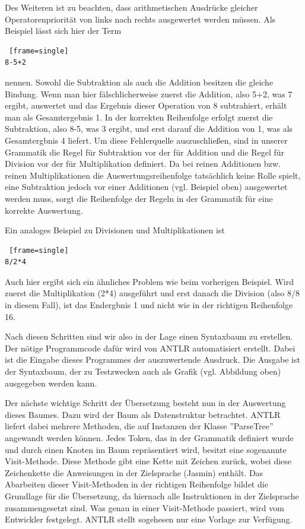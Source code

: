 \documentclass[12pt, a4paper, oneside, ngerman]{article}
\begin{document}
Des Weiteren ist zu beachten, dass arithmetischen Ausdrücke gleicher Operatorenpriorität von links  nach rechts ausgewertet werden müssen. Als Beispiel lässt sich hier der Term 
\begin{lstlisting} [frame=single]
8-5+2
\end{lstlisting}
nennen. Sowohl die Subtraktion als auch die Addition besitzen die gleiche Bindung. Wenn man hier fälschlicherweise zuerst die Addition, also 5+2, was 7 ergibt, auswertet und das Ergebnis dieser Operation von 8 subtrahiert, erhält man als Gesamtergebnis 1. 
In der korrekten Reihenfolge erfolgt zuerst die Subtraktion, also 8-5, was 3 ergibt, und erst darauf die Addition von 1, was als Gesamtergbnis 4 liefert. 
Um diese Fehlerquelle auszuschließen, sind in unserer Grammatik die Regel für Subtraktion vor der für Addition und die Regel für Division vor der für Multiplikation definiert. Da bei reinen Additionen bzw. reinen Multiplikationen die Auswertungsreihenfolge tatsächlich keine Rolle spielt, eine Subtraktion jedoch vor einer Additionen (vgl. Beispiel oben) ausgewertet werden muss, sorgt die Reihenfolge der Regeln in der Grammatik für eine korrekte Auswertung.

Ein analoges Beispiel zu Divisionen und Multiplikationen ist
\begin{lstlisting} [frame=single]
8/2*4
\end{lstlisting}
Auch hier ergibt sich ein ähnliches Problem wie beim vorherigen Beispiel. Wird zuerst die Multiplikation (2*4) ausgeführt und erst danach die Division (also 8/8 in diesem Fall), ist das Endergbnis 1 und nicht wie in der richtigen Reihenfolge 16.

Nach diesen Schritten sind wir also in der Lage einen Syntaxbaum zu erstellen. Der nötige Programmcode dafür wird von ANTLR automatisiert erstellt. Dabei ist die Eingabe dieses Programmes der auszuwertende Ausdruck. Die Ausgabe ist der Syntaxbaum, der zu Testzwecken auch als Grafik (vgl. Abbildung oben) ausgegeben werden kann. 

\pagebreak

Der nächste wichtige Schritt der Übersetzung besteht nun in der Auswertung dieses Baumes. Dazu wird der Baum als Datenstruktur betrachtet. ANTLR liefert dabei mehrere Methoden, die auf Instanzen der Klasse ''ParseTree'' angewandt werden können. 
Jedes Token, das in der Grammatik definiert wurde und durch einen Knoten im Baum repräsentiert wird, besitzt eine sogenannte Visit-Methode. Diese Methode gibt eine Kette mit Zeichen zurück, wobei diese Zeichenkette die Anweisungen in der Zielsprache (Jasmin) enthält. Das Abarbeiten dieser Visit-Methoden in der richtigen Reihenfolge bildet die Grundlage für die Übersetzung, da hiernach alle Instruktionen in der Zielsprache zusammengesetzt sind. Was genau in einer Visit-Methode passiert, wird vom Entwickler festgelegt. ANTLR stellt sogehesen nur eine Vorlage zur Verfügung.
\end{document}
